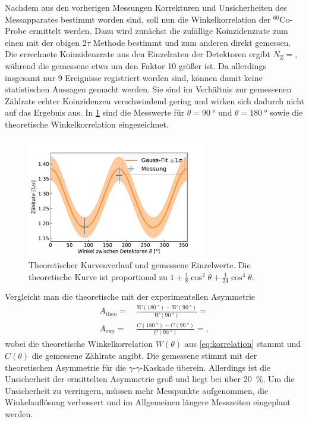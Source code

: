 	Nachdem aus den vorherigen Messungen Korrekturen und Unsicherheiten des Messapparates bestimmt worden sind, soll nun die Winkelkorrelation der $^{60}\text{Co}$-Probe ermittelt werden.
	Dazu wird zunächst die zufällige Koinzidenzrate zum einen mit der obigen $2\tau$ Methode bestimmt und zum anderen direkt gemessen.
	Die errechnete Koinzidenzrate aus den Einzelraten der Detektoren ergibt $N_\text{Z} = $, während die gemessene etwa um den Faktor 10 größer ist.
	Da allerdings insgesamt nur 9 Ereignisse registriert worden sind, können damit keine statistischen Aussagen gemacht werden.
	Sie sind im Verhältnis zur gemessenen Zählrate echter Koinzidenzen verschwindend gering und wirken sich dadurch nicht auf das Ergebnis aus.
	In \cref{fig:theoKurve} sind die Messwerte für $\theta = \SI{90}{\degree}$ und $\theta = \SI{180}{\degree}$ sowie die theoretische Winkelkorrelation eingezeichnet.
	
	\begin{figure}[ht]
		\centering
		\includegraphics[width=0.7\textwidth]{dat/theoKurve.pdf}
		\caption{Theoretischer Kurvenverlauf und gemessene Einzelwerte.
			Die theoretische Kurve ist proportional zu $1 + \frac{1}{8} \cos^2 \theta + \frac{1}{24} \cos^4 \theta$.}
		\label{fig:theoKurve}
	\end{figure}

	Vergleicht man die theoretische mit der experimentellen Asymmetrie
	\begin{align*}
		A_\text{theo} =&\, \frac{W(\SI{180}{\degree}) - W(\SI{90}{\degree})}{W(\SI{90}{\degree})} =  \\
		A_\text{exp} =&\, \frac{C(\SI{180}{\degree}) - C(\SI{90}{\degree})}{C(\SI{90}{\degree})} = ,
	\end{align*}
	wobei die theoretische Winkelkorrelation $W(\theta)$ aus \cref{eq:korrelation} stammt und $C(\theta)$ die gemessene Zählrate angibt.
	Die gemessene stimmt mit der theoretischen Asymmetrie für die \mbox{$\gamma$-$\gamma$-Kaskade} überein.
	Allerdings ist die Unsicherheit der ermittelten Asymmetrie groß und liegt bei über \SI{20}{\percent}.
	Um die Unsicherheit zu verringern, müssen mehr Messpunkte aufgenommen, die Winkelauflösung verbessert und im Allgemeinen längere Messzeiten eingeplant werden.
	